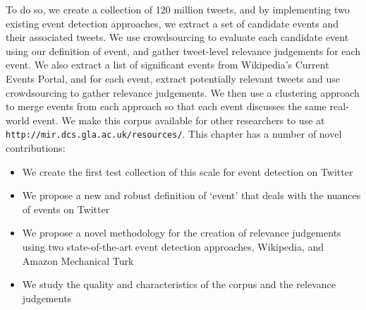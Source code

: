To do so, we create a collection of 120 million tweets, and by implementing two existing event detection approaches, we extract a set of candidate events and their associated tweets.
We use crowdsourcing to evaluate each candidate event using our definition of event, and gather tweet-level relevance judgements for each event.
We also extract a list of significant events from Wikipedia's Current Events Portal, and for each event, extract potentially relevant tweets and use crowdsourcing to gather relevance judgements.
We then use a clustering approach to merge events from each approach so that each event discusses the same real-world event.
We make this corpus available for other researchers to use at \texttt{http://mir.dcs.gla.ac.uk/resources/}. This chapter has a number of novel contributions:
\begin{itemize}
\item We create the first test collection of this scale for event detection on Twitter
\item We propose a new and robust definition of `event' that deals with the nuances of events on Twitter
\item We propose a novel methodology for the creation of relevance judgements using two state-of-the-art event detection approaches, Wikipedia, and Amazon Mechanical Turk
\item We study the quality and characteristics of the corpus and the relevance judgements
\end{itemize}
